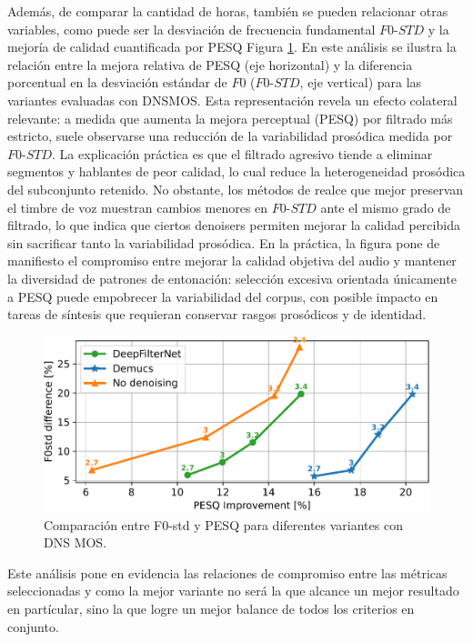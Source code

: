 Además, de comparar la cantidad de horas, también se pueden relacionar otras variables, como puede ser la desviación de frecuencia fundamental \(F0\text{-}STD\) y la mejoría de calidad cuantificada por PESQ Figura \ref{fig:F0_vs_PESQ}. En este análisis se ilustra la relación entre la mejora relativa de PESQ (eje horizontal) y la diferencia porcentual en la desviación estándar de \(F0\) (\(F0\text{-}STD\), eje vertical) para las variantes evaluadas con DNSMOS. Esta representación revela un efecto colateral relevante: a medida que aumenta la mejora perceptual (PESQ) por filtrado más estricto, suele observarse una reducción de la variabilidad prosódica medida por \(F0\text{-}STD\). La explicación práctica es que el filtrado agresivo tiende a eliminar segmentos y hablantes de peor calidad, lo cual reduce la heterogeneidad prosódica del subconjunto retenido. No obstante, los métodos de realce que mejor preservan el timbre de voz muestran cambios menores en \(F0\text{-}STD\) ante el mismo grado de filtrado, lo que indica que ciertos denoisers permiten mejorar la calidad percibida sin sacrificar tanto la variabilidad prosódica. En la práctica, la figura pone de manifiesto el compromiso entre mejorar la calidad objetiva del audio y mantener la diversidad de patrones de entonación: selección excesiva orientada únicamente a PESQ puede empobrecer la variabilidad del corpus, con posible impacto en tareas de síntesis que requieran conservar rasgos prosódicos y de identidad.

\begin{figure}[h]
  \centering
  \centerline{\includegraphics[width=12cm]{Figuras/Pipeline/F0 vs pesq.pdf}}
  \caption{Comparación entre F0-std y PESQ para diferentes variantes con DNS MOS.}
    \label{fig:F0_vs_PESQ}
\end{figure}

Este análisis pone en evidencia las relaciones de compromiso entre las métricas seleccionadas y como la mejor variante no será la que alcance un mejor resultado en partícular, sino la que logre un mejor balance de todos los criterios en conjunto.

